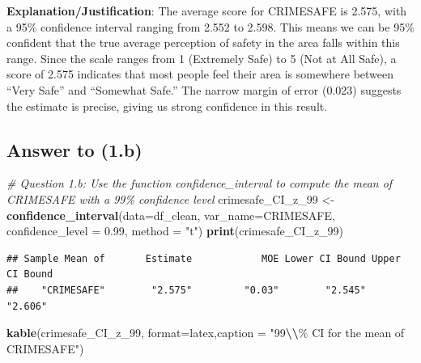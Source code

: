 \documentclass[
  11pt,
]{article}
\newenvironment{Shaded}{\begin{snugshade}}{\end{snugshade}}
\newcommand{\AttributeTok}[1]{\textcolor[rgb]{0.13,0.29,0.53}{#1}}
\newcommand{\CommentTok}[1]{\textcolor[rgb]{0.56,0.35,0.01}{\textit{#1}}}
\newcommand{\FloatTok}[1]{\textcolor[rgb]{0.00,0.00,0.81}{#1}}
\newcommand{\FunctionTok}[1]{\textcolor[rgb]{0.13,0.29,0.53}{\textbf{#1}}}
\newcommand{\NormalTok}[1]{#1}
\newcommand{\OtherTok}[1]{\textcolor[rgb]{0.56,0.35,0.01}{#1}}
\newcommand{\SpecialCharTok}[1]{\textcolor[rgb]{0.81,0.36,0.00}{\textbf{#1}}}
\newcommand{\StringTok}[1]{\textcolor[rgb]{0.31,0.60,0.02}{#1}}
\begin{document}
\textbf{Explanation/Justification}: The average score for CRIMESAFE is
2.575, with a 95\% confidence interval ranging from 2.552 to 2.598. This
means we can be 95\% confident that the true average perception of
safety in the area falls within this range. Since the scale ranges from
1 (Extremely Safe) to 5 (Not at All Safe), a score of 2.575 indicates
that most people feel their area is somewhere between ``Very Safe'' and
``Somewhat Safe.'' The narrow margin of error (0.023) suggests the
estimate is precise, giving us strong confidence in this result.

\subsection{Answer to (1.b)}\label{answer-to-1.b}

\begin{Shaded}
\begin{Highlighting}[]
\CommentTok{\# Question 1.b: Use the function \textasciigrave{}confidence\_interval\textasciigrave{} to compute the mean of \textasciigrave{}CRIMESAFE\textasciigrave{} with a 99\% confidence level}
\NormalTok{crimesafe\_CI\_z\_99 }\OtherTok{\textless{}{-}} \FunctionTok{confidence\_interval}\NormalTok{(}\AttributeTok{data=}\NormalTok{df\_clean, }
                                         \AttributeTok{var\_name=}\StringTok{\textquotesingle{}CRIMESAFE\textquotesingle{}}\NormalTok{, }
                                         \AttributeTok{confidence\_level =} \FloatTok{0.99}\NormalTok{, }\AttributeTok{method =} \StringTok{"t"}\NormalTok{)}
\FunctionTok{print}\NormalTok{(crimesafe\_CI\_z\_99)}
\end{Highlighting}
\end{Shaded}

\begin{verbatim}
## Sample Mean of       Estimate            MOE Lower CI Bound Upper CI Bound
##    "CRIMESAFE"        "2.575"         "0.03"        "2.545"        "2.606"
\end{verbatim}

\begin{Shaded}
\begin{Highlighting}[]
\FunctionTok{kable}\NormalTok{(crimesafe\_CI\_z\_99, }\AttributeTok{format=}\StringTok{\textquotesingle{}latex\textquotesingle{}}\NormalTok{,}\AttributeTok{caption =} \StringTok{"99}\SpecialCharTok{\textbackslash{}\textbackslash{}}\StringTok{\% CI for the mean of \textasciigrave{}CRIMESAFE\textasciigrave{}"}\NormalTok{)}
\end{Highlighting}
\end{Shaded}
\end{document}
